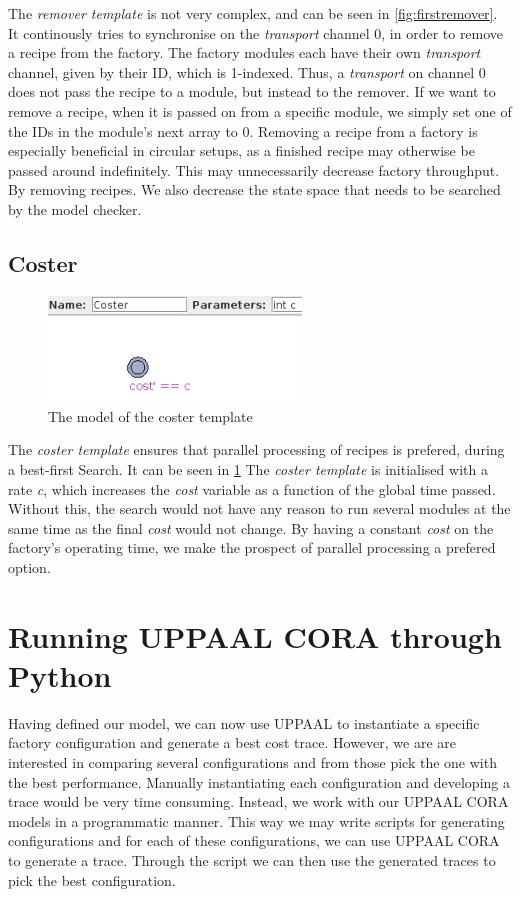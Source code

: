The \emph{remover template} is not very complex, and can be seen in \cref{fig:firstremover}. It continously tries to synchronise on the \emph{transport} channel 0, in order to remove a recipe from the factory. The factory modules each have their own \emph{transport} channel, given by their ID, which is 1-indexed. Thus, a \emph{transport} on channel 0 does not pass the recipe to a module, but instead to the remover. If we want to remove a recipe, when it is passed on from a specific module, we simply set one of the IDs in the module’s next array to 0. Removing a recipe from a factory is especially beneficial in circular setups, as a finished recipe may otherwise be passed around indefinitely. This may unnecessarily decrease factory throughput. By removing recipes. We also decrease the state space that needs to be searched by the model checker.

\subsection{Coster}
\label{subs:coster}

\begin{figure}[h]
\centering
\includegraphics[width=0.6\textwidth]{images/firstcoster.png}
\caption{The model of the coster template}
\label{fig:firstcoster}
\end{figure}

The \emph{coster template} ensures that parallel processing of recipes is prefered, during a best-first Search. It can be seen in \cref{fig:firstcoster} The \emph{coster template} is initialised with a rate \emph{c}, which increases the \emph{cost} variable as a function of the global time passed. Without this, the search would not have any reason to run several modules at the same time as the final \emph{cost} would not change. By having a constant \emph{cost} on the factory’s operating time, we make the prospect of parallel processing a prefered option.

\section{Running UPPAAL CORA through Python}
Having defined our model, we can now use UPPAAL to instantiate a specific factory configuration and generate a best cost trace. However, we are are interested in comparing several configurations and from those pick the one with the best performance. Manually instantiating each configuration and developing a trace would be very time consuming. Instead, we work with our UPPAAL CORA models in a programmatic manner. This way we may write scripts for generating configurations and for each of these configurations, we can use UPPAAL CORA to generate a trace. Through the script we can then use the generated traces to pick the best configuration.

